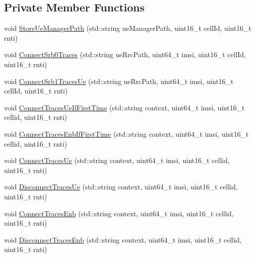 \subsection*{Private Member Functions}
\begin{DoxyCompactItemize}
\item 
void \hyperlink{classns3_1_1RadioBearerStatsConnector_a413a341a69c6ab2aa239da5bde547144}{Store\+Ue\+Manager\+Path} (std\+::string ue\+Manager\+Path, uint16\+\_\+t cell\+Id, uint16\+\_\+t rnti)
\item 
void \hyperlink{classns3_1_1RadioBearerStatsConnector_a717b470bb9a095dfb9d44c34c1b09e15}{Connect\+Srb0\+Traces} (std\+::string ue\+Rrc\+Path, uint64\+\_\+t imsi, uint16\+\_\+t cell\+Id, uint16\+\_\+t rnti)
\item 
void \hyperlink{classns3_1_1RadioBearerStatsConnector_a90ac6a32467a5c2a34798be490b8564a}{Connect\+Srb1\+Traces\+Ue} (std\+::string ue\+Rrc\+Path, uint64\+\_\+t imsi, uint16\+\_\+t cell\+Id, uint16\+\_\+t rnti)
\item 
void \hyperlink{classns3_1_1RadioBearerStatsConnector_a004457e15ac7a6ea13a2f66123c11ffe}{Connect\+Traces\+Ue\+If\+First\+Time} (std\+::string context, uint64\+\_\+t imsi, uint16\+\_\+t cellid, uint16\+\_\+t rnti)
\item 
void \hyperlink{classns3_1_1RadioBearerStatsConnector_a1e460064135aff49f310a158accd43e4}{Connect\+Traces\+Enb\+If\+First\+Time} (std\+::string context, uint64\+\_\+t imsi, uint16\+\_\+t cellid, uint16\+\_\+t rnti)
\item 
void \hyperlink{classns3_1_1RadioBearerStatsConnector_ae4e70abbb6eb392e692a63115cee1d1b}{Connect\+Traces\+Ue} (std\+::string context, uint64\+\_\+t imsi, uint16\+\_\+t cellid, uint16\+\_\+t rnti)
\item 
void \hyperlink{classns3_1_1RadioBearerStatsConnector_ab72ca91fbcb231a56b91eea99822b6ec}{Disconnect\+Traces\+Ue} (std\+::string context, uint64\+\_\+t imsi, uint16\+\_\+t cellid, uint16\+\_\+t rnti)
\item 
void \hyperlink{classns3_1_1RadioBearerStatsConnector_a1a09fef5f081a058913a917c8a78cfc5}{Connect\+Traces\+Enb} (std\+::string context, uint64\+\_\+t imsi, uint16\+\_\+t cellid, uint16\+\_\+t rnti)
\item 
void \hyperlink{classns3_1_1RadioBearerStatsConnector_a8bfed671da65ae41806bcb656512fcf2}{Disconnect\+Traces\+Enb} (std\+::string context, uint64\+\_\+t imsi, uint16\+\_\+t cellid, uint16\+\_\+t rnti)
\end{DoxyCompactItemize}
